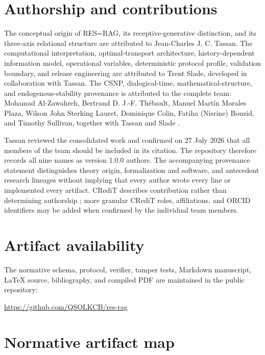 \documentclass[11pt]{article}
\begin{document}
\section*{Authorship and contributions}

The conceptual origin of RES=RAG, its receptive-generative distinction, and
its three-axis relational structure are attributed to Jean-Charles J. C.
Tassan. The computational interpretation, optimal-transport architecture,
history-dependent information model, operational variables, deterministic
protocol profile, validation boundary, and release engineering are attributed
to Trent Slade, developed in collaboration with Tassan. The CSNP,
dialogical-time, mathematical-structure, and endogenous-stability provenance is
attributed to the complete team: Mohamad Al-Zawahreh, Bertrand D. J.-F.
Thébault, Manuel Martín Morales Plaza, Wilson John Sterking Lauret, Dominique
Colin, Fatiha (Nisrine) Bouzid, and Timothy Sullivan, together with Tassan and
Slade \citep{csnp-wasserstein,tassan-thebault-treal,resrag-tcfq,
team-endogenous-stability}.

Tassan reviewed the consolidated work and confirmed on 27 July 2026 that all
members of the team should be included in its citation. The repository
therefore records all nine names as version 1.0.0 authors. The accompanying
provenance statement distinguishes theory origin, formalization and software,
and antecedent research lineages without implying that every author wrote
every line or implemented every artifact. CRediT describes contribution rather
than determining authorship \citep{brand2022credit}; more granular CRediT
roles, affiliations, and ORCID identifiers may be added when confirmed by the
individual team members.

\section*{Artifact availability}

The normative schema, protocol, verifier, tamper tests, Markdown manuscript,
LaTeX source, bibliography, and compiled PDF are maintained in the public
repository:
\begin{center}
\url{https://github.com/QSOLKCB/res-rag}
\end{center}




\appendix
\section{Normative artifact map}
\end{document}
